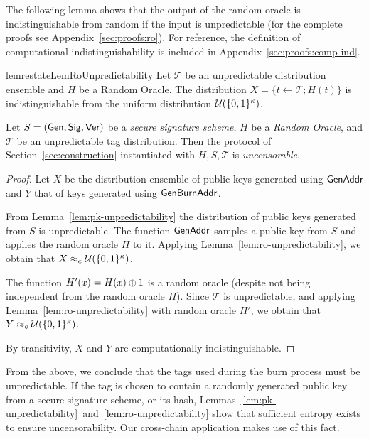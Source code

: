 The following lemma shows that the output of the random oracle is
indistinguishable from random if the input is unpredictable
(for the complete proofs see Appendix~\ref{sec:proofs:ro}).
For reference, the
definition of computational indistinguishability is included in
Appendix~\ref{sec:proofs:comp-ind}.

\begin{restatable}{lem}{restateLemRoUnpredictability}
  \label{lem:ro-unpredictability}
  Let $\mathcal{T}$ be an unpredictable distribution ensemble and $H$ be a
  Random Oracle.
  The distribution $X = \{t \gets \mathcal{T}; H(t)\}$ is indistinguishable from
  the uniform distribution $\mathcal{U}(\{0,1\}^\kappa)$.
\end{restatable}

\begin{theorem}[Uncensorability]
  Let $S = (\mathsf{Gen}, \mathsf{Sig}, \mathsf{Ver})$ be a \emph{secure signature scheme},
  $H$ be a \emph{Random Oracle},
  and $\mathcal{T}$ be an unpredictable tag distribution.
  Then the protocol of Section~\ref{sec:construction} instantiated with
  $H, S, \mathcal{T}$ is \emph{uncensorable}.
\end{theorem}
\begin{proof}
  Let $X$ be the distribution ensemble of public keys generated using $\mathsf{GenAddr}$
  and $Y$ that of keys generated using $\mathsf{Gen}\-\mathsf{Burn}\-\mathsf{Addr}$.

  From Lemma~\ref{lem:pk-unpredictability} the distribution of
  public keys generated from $S$ is unpredictable. The
  function $\mathsf{GenAddr}$ samples a public key from $S$ and applies the
  random oracle $H$ to it. Applying
  Lemma~\ref{lem:ro-unpredictability}, we obtain that
  $X \approx_c \mathcal{U}(\{0, 1\}^\kappa)$.

  The function $H'(x) = H(x) \oplus 1$ is a random oracle (despite not
  being independent from the random oracle $H$).
  Since $\mathcal{T}$ is unpredictable, and
  applying Lemma~\ref{lem:ro-unpredictability} with random oracle $H'$, we
  obtain that $Y \approx_c \mathcal{U}(\{0, 1\}^\kappa)$.

  By transitivity, $X$ and $Y$ are computationally indistinguishable.
\end{proof}

From the above, we conclude that the tags used during the burn process must be
unpredictable. If the tag is chosen to contain a randomly generated public key
from a secure signature scheme, or its hash,
Lemmas~\ref{lem:pk-unpredictability}~and~\ref{lem:ro-unpredictability} show that
sufficient entropy exists to ensure uncensorability. Our cross-chain application
makes use of this fact.
